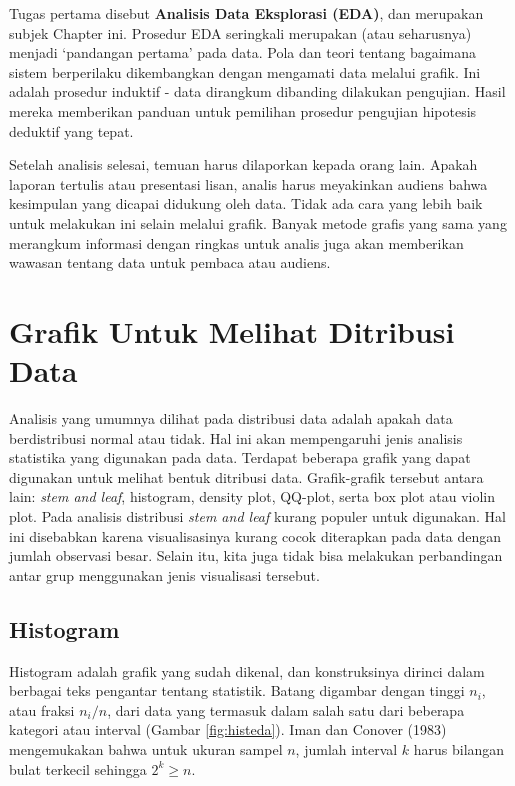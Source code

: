 \documentclass[]{book}
\begin{document}
Tugas pertama disebut \textbf{Analisis Data Eksplorasi (EDA)}, dan
merupakan subjek Chapter ini. Prosedur EDA seringkali merupakan (atau
seharusnya) menjadi `pandangan pertama' pada data. Pola dan teori
tentang bagaimana sistem berperilaku dikembangkan dengan mengamati data
melalui grafik. Ini adalah prosedur induktif - data dirangkum dibanding
dilakukan pengujian. Hasil mereka memberikan panduan untuk pemilihan
prosedur pengujian hipotesis deduktif yang tepat.

Setelah analisis selesai, temuan harus dilaporkan kepada orang lain.
Apakah laporan tertulis atau presentasi lisan, analis harus meyakinkan
audiens bahwa kesimpulan yang dicapai didukung oleh data. Tidak ada cara
yang lebih baik untuk melakukan ini selain melalui grafik. Banyak metode
grafis yang sama yang merangkum informasi dengan ringkas untuk analis
juga akan memberikan wawasan tentang data untuk pembaca atau audiens.

\section{Grafik Untuk Melihat Ditribusi
Data}\label{grafik-untuk-melihat-ditribusi-data}

Analisis yang umumnya dilihat pada distribusi data adalah apakah data
berdistribusi normal atau tidak. Hal ini akan mempengaruhi jenis
analisis statistika yang digunakan pada data. Terdapat beberapa grafik
yang dapat digunakan untuk melihat bentuk ditribusi data. Grafik-grafik
tersebut antara lain: \emph{stem and leaf}, histogram, density plot,
QQ-plot, serta box plot atau violin plot. Pada analisis distribusi
\emph{stem and leaf} kurang populer untuk digunakan. Hal ini disebabkan
karena visualisasinya kurang cocok diterapkan pada data dengan jumlah
observasi besar. Selain itu, kita juga tidak bisa melakukan perbandingan
antar grup menggunakan jenis visualisasi tersebut.

\subsection{Histogram}\label{histogram}

Histogram adalah grafik yang sudah dikenal, dan konstruksinya dirinci
dalam berbagai teks pengantar tentang statistik. Batang digambar dengan
tinggi \(n_i\), atau fraksi \(n_i/n\), dari data yang termasuk dalam
salah satu dari beberapa kategori atau interval (Gambar
\ref{fig:histeda}). Iman dan Conover (1983) mengemukakan bahwa untuk
ukuran sampel \(n\), jumlah interval \(k\) harus bilangan bulat terkecil
sehingga \(2^k≥n\).
\end{document}
